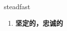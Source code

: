 
\begin{frame}
{\huge steadfast}
\begin{center}
\begin{enumerate}\Large
  \item \textbf{坚定的，忠诚的}
\end{enumerate}
\end{center}
\end{frame}
